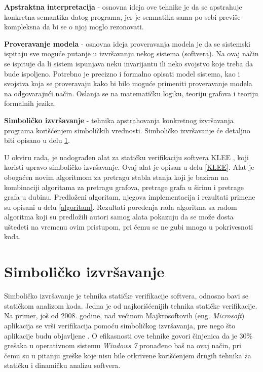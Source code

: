 \documentclass[12pt,oneside]{memoir}
\begin{document}
\begin{description}
    \item \textbf{Apstraktna interpretacija} \cite{abstract_interpretation} - osnovna ideja ove tehnike je da se apstrahuje konkretna semantika datog programa, jer je semnatika sama po sebi previše kompleksna da bi se o njoj moglo rezonovati.

    \item \textbf{Proveravanje modela} \cite{model_checking} - osnovna ideja proveravanja modela je da se sistemski ispitaju sve moguće putanje u izvršavanju nekog sistema (softvera). Na ovaj način se ispituje da li sistem ispunjava neku invarijantu ili neko svojstvo koje treba da bude ispoljeno. Potrebno je precizno i formalno opisati model sistema, kao i svojstva koja se proveravaju kako bi bilo moguće primeniti proveravanje modela na odgovarajući način. Oslanja se na matematičku logiku, teoriju grafova i teoriju formalnih jezika.
    
    \item \textbf{Simboličko izvršavanje} - tehnika apstrahovanja konkretnog izvršavanja programa korišćenjem simboličkih vrednosti. Simboličko izvršavanje će detaljno biti opisano u delu \ref{chp:simbolicko_izvrsavanje}.
    
\end{description}

U okviru rada, je nadograđen alat za statičku verifikaciju softvera KLEE \cite{klee}, koji koristi upravo simboličko izvršavanje. Ovaj alat je opisan u delu \ref{KLEE}. Alat je obogaćen novim algoritmom za pretragu stabla stanja koji je baziran na kombinaciji algoritama za pretragu grafova, pretrage grafa u širinu i pretrage grafa u dubinu. Predloženi algoritam, njegova implementacija i rezultati primene su 
opisani u delu \ref{algoritam}. Rezultati poređenja rada algoritma sa radom algoritma koji su predložili autori samog alata pokazuju da se može dosta uštedeti na vremenu ovim pristupom, pri čemu se ne gubi mnogo u pokrivesnoti koda.

\chapter{Simboličko izvršavanje} \label{chp:simbolicko_izvrsavanje}

\indent Simboličko izvršavanje je tehnika statičke verifikacije softvera, odnosno bavi se statičkom analizom koda. Jedna je od najkorišćenijih tehnika statičke verifikacije. Na primer, još od 2008. godine, nad većinom Majkrosoftovih (eng. \textit{Microsoft}) aplikacija se vrši verifikacija pomoću simboličkog izvršavanja, pre nego što aplikacije budu objavljene \cite{microsoft}. O efikasnosti ove tehnike govori činjenica da je 30\% grešaka u operativnom sistemu \textit{Windows 7} pronađeno baš na ovaj način, pri čemu su u pitanju greške koje nisu bile otkrivene korišćenjem drugih tehnika za statičku i dinamičku analizu softvera.
\end{document}
